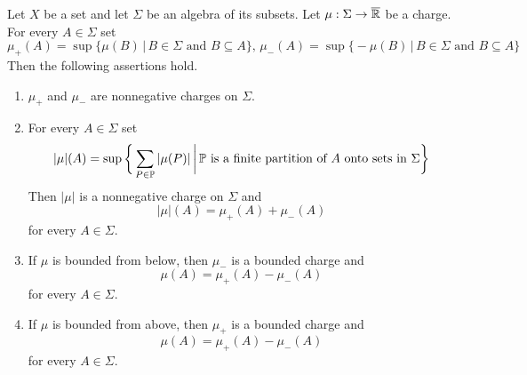 \begin{theorem}\label{theorem:Jordan_decomposition}
    Let $X$ be a set and let $\Sigma$ be an algebra of its subsets. Let $\mu:\Sigma \rightarrow \overline{{\mathbb R}}$ be a charge. For every $A \in \Sigma$ set
    $$\mu_+(A) = \sup\big\{\mu(B)\,\big|\,B\in \Sigma\mbox{ and }B\subseteq A\big\},\,\mu_-(A) = \sup\big\{-\mu(B)\,\big|\,B\in \Sigma\mbox{ and }B\subseteq A\big\}$$
    Then the following assertions hold.
    \begin{enumerate}[label=\emph{\textbf{(\arabic*)}}, leftmargin=*]
        \item $\mu_+$ and $\mu_-$ are nonnegative charges on $\Sigma$.
        \item For every $A \in \Sigma$ set
              $$|\mu|(A) = \sup \bigg\{\sum_{P\in {\mathbb P}}|\mu(P)|\,\bigg|\,{\mathbb P}\mbox{ is a finite partition of }A\mbox{ onto sets in }\Sigma\bigg\}$$
              Then $|\mu|$ is a nonnegative charge on $\Sigma$ and
              $$|\mu|(A) = \mu_+(A) + \mu_-(A)$$
              for every $A \in \Sigma$.
        \item If $\mu$ is bounded from below, then $\mu_-$ is a bounded charge and
              $$\mu(A) = \mu_+(A) - \mu_-(A)$$
              for every $A \in \Sigma$.
        \item If $\mu$ is bounded from above, then $\mu_+$ is a bounded charge and
              $$\mu(A) = \mu_+(A) - \mu_-(A)$$
              for every $A \in \Sigma$.
    \end{enumerate}
\end{theorem}
